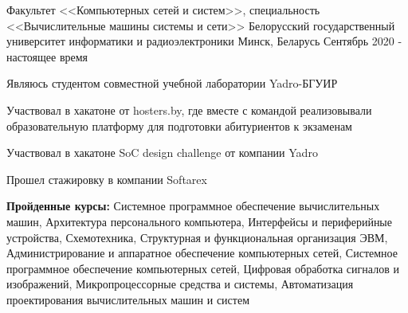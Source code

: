 

\begin{cventries}

  \cventry
    {Факультет <<Компьютерных сетей и систем>>,
    специальность <<Вычислительные машины системы и сети>>} %
    {Белорусский государственный университет информатики и радиоэлектроники} %
    {Минск, Беларусь} %
    {Сентябрь 2020 - настоящее время} %
    {
      \begin{cvitems} %
        \item {Являюсь студентом совместной учебной лаборатории Yadro-БГУИР}
        \item {Участвовал в хакатоне от hosters.by, где вместе с командой реализовывали образовательную 
              платформу для подготовки абитуриентов к экзаменам}
        \item {Участвовал в хакатоне SoC design challenge от компании Yadro}
        \item {Прошел стажировку в компании Softarex}
        \item {\textbf{Пройденные курсы:} 
              Системное программное обеспечение вычислительных машин,
              Архитектура персонального компьютера,
              Интерфейсы и периферийные устройства,
              Схемотехника,
              Структурная и функциональная организация ЭВМ,
              Администрирование и аппаратное обеспечение компьютерных сетей,
              Системное программное обеспечение компьютерных сетей,
              Цифровая обработка сигналов и изображений,
              Микропроцессорные средства и системы,
              Автоматизация проектирования вычислительных машин и систем
              }
      \end{cvitems}
    }
\end{cventries}
